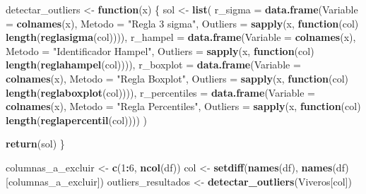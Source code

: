 \documentclass[
]{article}
\newenvironment{Shaded}{\begin{snugshade}}{\end{snugshade}}
\newcommand{\AttributeTok}[1]{\textcolor[rgb]{0.13,0.29,0.53}{#1}}
\newcommand{\ControlFlowTok}[1]{\textcolor[rgb]{0.13,0.29,0.53}{\textbf{#1}}}
\newcommand{\DecValTok}[1]{\textcolor[rgb]{0.00,0.00,0.81}{#1}}
\newcommand{\FunctionTok}[1]{\textcolor[rgb]{0.13,0.29,0.53}{\textbf{#1}}}
\newcommand{\NormalTok}[1]{#1}
\newcommand{\OtherTok}[1]{\textcolor[rgb]{0.56,0.35,0.01}{#1}}
\newcommand{\SpecialCharTok}[1]{\textcolor[rgb]{0.81,0.36,0.00}{\textbf{#1}}}
\newcommand{\StringTok}[1]{\textcolor[rgb]{0.31,0.60,0.02}{#1}}
\begin{document}
\begin{Shaded}
\begin{Highlighting}[]
\NormalTok{detectar\_outliers }\OtherTok{\textless{}{-}} \ControlFlowTok{function}\NormalTok{(x) \{}
\NormalTok{  sol }\OtherTok{\textless{}{-}} \FunctionTok{list}\NormalTok{(}
    \AttributeTok{r\_sigma =} \FunctionTok{data.frame}\NormalTok{(}\AttributeTok{Variable =} \FunctionTok{colnames}\NormalTok{(x), }\AttributeTok{Metodo =} \StringTok{"Regla 3 sigma"}\NormalTok{, }
              \AttributeTok{Outliers =} \FunctionTok{sapply}\NormalTok{(x, }\ControlFlowTok{function}\NormalTok{(col) }\FunctionTok{length}\NormalTok{(}\FunctionTok{reglasigma}\NormalTok{(col)))),}
    \AttributeTok{r\_hampel =} \FunctionTok{data.frame}\NormalTok{(}\AttributeTok{Variable =} \FunctionTok{colnames}\NormalTok{(x), }\AttributeTok{Metodo =} \StringTok{"Identificador Hampel"}\NormalTok{, }
               \AttributeTok{Outliers =} \FunctionTok{sapply}\NormalTok{(x, }\ControlFlowTok{function}\NormalTok{(col) }\FunctionTok{length}\NormalTok{(}\FunctionTok{reglahampel}\NormalTok{(col)))),}
    \AttributeTok{r\_boxplot =} \FunctionTok{data.frame}\NormalTok{(}\AttributeTok{Variable =} \FunctionTok{colnames}\NormalTok{(x), }\AttributeTok{Metodo =} \StringTok{"Regla Boxplot"}\NormalTok{, }
                \AttributeTok{Outliers =} \FunctionTok{sapply}\NormalTok{(x, }\ControlFlowTok{function}\NormalTok{(col) }\FunctionTok{length}\NormalTok{(}\FunctionTok{reglaboxplot}\NormalTok{(col)))),}
    \AttributeTok{r\_percentiles =} \FunctionTok{data.frame}\NormalTok{(}\AttributeTok{Variable =} \FunctionTok{colnames}\NormalTok{(x), }\AttributeTok{Metodo =} \StringTok{"Regla Percentiles"}\NormalTok{, }
                    \AttributeTok{Outliers =} \FunctionTok{sapply}\NormalTok{(x, }\ControlFlowTok{function}\NormalTok{(col) }\FunctionTok{length}\NormalTok{(}\FunctionTok{reglapercentil}\NormalTok{(col))))}
\NormalTok{  )}

  \FunctionTok{return}\NormalTok{(sol)}
\NormalTok{\}}


\NormalTok{columnas\_a\_excluir }\OtherTok{\textless{}{-}} \FunctionTok{c}\NormalTok{(}\DecValTok{1}\SpecialCharTok{:}\DecValTok{6}\NormalTok{, }\FunctionTok{ncol}\NormalTok{(df))}
\NormalTok{col }\OtherTok{\textless{}{-}} \FunctionTok{setdiff}\NormalTok{(}\FunctionTok{names}\NormalTok{(df), }\FunctionTok{names}\NormalTok{(df)[columnas\_a\_excluir])}
\NormalTok{outliers\_resultados }\OtherTok{\textless{}{-}} \FunctionTok{detectar\_outliers}\NormalTok{(Viveros[col])}


\end{Highlighting}
\end{Shaded}
\end{document}
